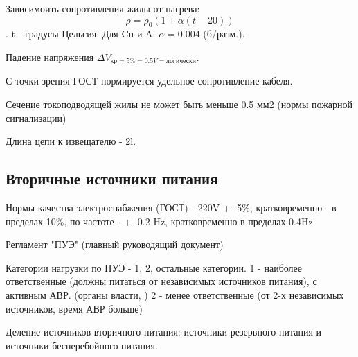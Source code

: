 \documentclass[a4paper,12pt]{report}
\begin{document}
	Зависимоить сопротивления жилы от нагрева: $$\rho =  \rho_0(1+\alpha(t - 20)) $$. t - градусы Цельсия.
	Для Cu и Al $\alpha = 0.004$ (б/разм.).

	Падение напряжения
	$\Delta V_{\mbox{кр} = 5\% = 0.5V = \mbox{логически}}$.

	С точки зрения ГОСТ нормируется удельное сопротивление кабеля.

	Сечение токоподводящей жилы не может быть меньше 0.5 мм2 (нормы пожарной сигнализации)

	Длина цепи к извещателю - 2l.


	\subsection{Вторичные источники питания}

	Нормы качества электроснабжения (ГОСТ) - 220V +- 5\%, кратковременно - в пределах 10\%, по частоте - +- 0.2 Hz, кратковременно в пределах 0.4Hz

	Регламент "ПУЭ" (главный руководящий документ)

	Категории нагрузки по ПУЭ - 1, 2, остальные категории.
	1 - наиболее ответственные (должны питаться от независимых источников питания), с активным АВР. (органы власти, )
	2 - менее ответственные (от 2-х независимых источников, время АВР больше)


	Деление источников вторичного питания: источники резервного питания и источники бесперебойного питания.
\end{document}
